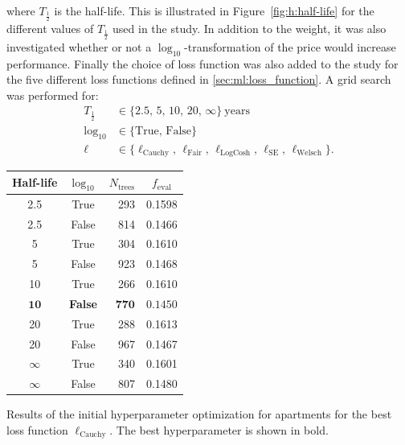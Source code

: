\noindent where $T_{\frac{1}{2}}$ is the half-life. This is illustrated in Figure~\ref{fig:h:half-life} for the different values of $T_{\frac{1}{2}}$ used in the study.  In addition to the weight, it was also investigated whether or not a $\log_{10}$-transformation of the price would increase performance. Finally the choice of loss function was also added to the study for the five different loss functions defined in \autoref{sec:ml:loss_function}. A grid search was performed for:
\begin{equation}
  \begin{split}
    T_{\frac{1}{2}} &\in \{2.5,\, 5,\, 10,\, 20,\, \infty \}~\mathrm{ years} \\
    \log_{10} &\in \{\mathrm{True},\, \mathrm{False} \} \\
    \ell &\in \{ \ell_\mathrm{Cauchy},\, \ell_\mathrm{Fair},\, \ell_\mathrm{LogCosh},\, \ell_\mathrm{SE},\, \ell_\mathrm{Welsch}\}.
  \end{split}
\end{equation}

\begin{margintable}[-1cm]
  \begin{tabular}{@{}ccrc@{}}
    Half-life & $\log_{10}$ & $N_\mathrm{trees}$ & $f_\mathrm{eval}$ \\
    \midrule
    \num{2.5} & True & \num{293} & \num{0.1598} \\
    \num{2.5} & False & \num{814} & \num{0.1466} \\
    \num{5} & True & \num{304} & \num{0.1610} \\
    \num{5} & False & \num{923} & \num{0.1468} \\
    \num{10} & True & \num{266} & \num{0.1610} \\
    $\mathbf{10}$ & \textbf{False} & $\mathbf{770}$ & $\mathbf{0.1450}$ \\
    \num{20} & True & \num{288} & \num{0.1613} \\
    \num{20} & False & \num{967} & \num{0.1467} \\
    $\infty$ & True & \num{340} & \num{0.1601} \\
    $\infty$ & False & \num{807} & \num{0.1480} \\
  \end{tabular}
  \vspace{1.5mm}
  \caption[Results from the Initial Hyperparameter Optimization for Apartments]{\label{tab:h:HPO_initial_Cauchy-ejerlejlighed}Results of the initial hyperparameter optimization for apartments for the best loss function $\ell_\mathrm{Cauchy}$. The best hyperparameter is shown in bold.}
\end{margintable}


